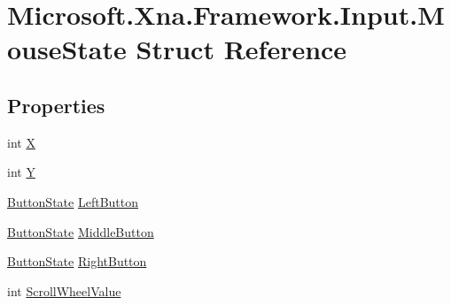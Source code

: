 \hypertarget{struct_microsoft_1_1_xna_1_1_framework_1_1_input_1_1_mouse_state}{}\section{Microsoft.\+Xna.\+Framework.\+Input.\+Mouse\+State Struct Reference}
\label{struct_microsoft_1_1_xna_1_1_framework_1_1_input_1_1_mouse_state}
\subsection*{Properties}
\begin{DoxyCompactItemize}
\item 
int \hyperlink{struct_microsoft_1_1_xna_1_1_framework_1_1_input_1_1_mouse_state_a40608236b19b6280f5d4b20886a352d2}{X}
\item 
int \hyperlink{struct_microsoft_1_1_xna_1_1_framework_1_1_input_1_1_mouse_state_a0f3da79ce609dccc256f7a94cfcf5fb9}{Y}
\item 
\hyperlink{namespace_microsoft_1_1_xna_1_1_framework_1_1_input_a1a87ac3c1443696fdac6f8cdd396b161}{Button\+State} \hyperlink{struct_microsoft_1_1_xna_1_1_framework_1_1_input_1_1_mouse_state_a81a63963571045826cbc0eff25b9ce28}{Left\+Button}
\item 
\hyperlink{namespace_microsoft_1_1_xna_1_1_framework_1_1_input_a1a87ac3c1443696fdac6f8cdd396b161}{Button\+State} \hyperlink{struct_microsoft_1_1_xna_1_1_framework_1_1_input_1_1_mouse_state_a8ef86336251b6b9c8a06d77d97e22f84}{Middle\+Button}
\item 
\hyperlink{namespace_microsoft_1_1_xna_1_1_framework_1_1_input_a1a87ac3c1443696fdac6f8cdd396b161}{Button\+State} \hyperlink{struct_microsoft_1_1_xna_1_1_framework_1_1_input_1_1_mouse_state_ad8648ef8bbb6a0a59e54ae6592d7c6fa}{Right\+Button}
\item 
int \hyperlink{struct_microsoft_1_1_xna_1_1_framework_1_1_input_1_1_mouse_state_a977aa23deae00457277cf562fb21c019}{Scroll\+Wheel\+Value}
\end{DoxyCompactItemize}



